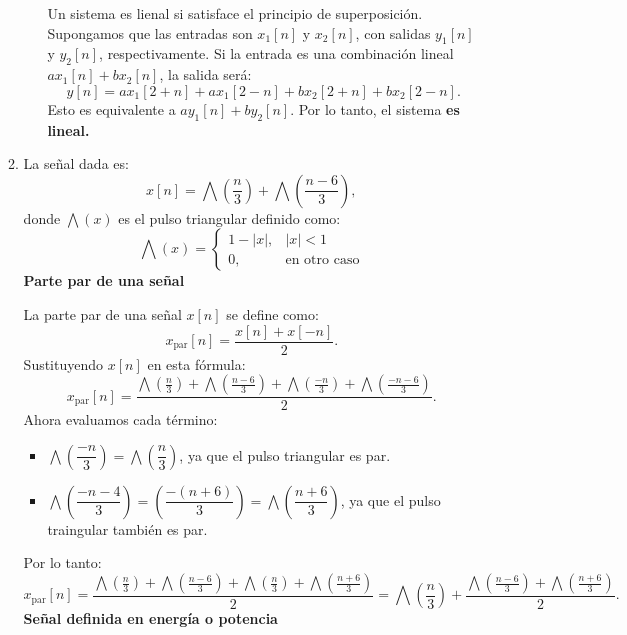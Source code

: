 \begin{enumerate}[label=\color{red}\textbf{\arabic*)}]
\begin{enumerate}[label=\color{red}\textbf{\alph*)}]
\begin{enumerate}[label=\textbf{\arabic*)}]
                    Un sistema es lienal si satisface el principio de superposición. Supongamos que las entradas son $x_1[n]$ y $x_2[n]$, con salidas $y_1[n]$ y $y_2[n]$, respectivamente. Si la entrada es una combinación lineal $ax_1[n]+bx_2[n]$, la salida será: \[
                        y[n]=ax_1[2+n]+ax_1[2-n]+bx_2[2+n]+bx_2[2-n].
                    \] 
                    Esto es equivalente a $ay_1[n]+by_2[n]$. Por lo tanto, el sistema \textbf{es lineal.} 
            \end{enumerate}
        \item {}

            La señal dada es: \[
                x[n]=\bigwedge\left( \dfrac{n}{3} \right) +\bigwedge\left( \dfrac{n-6}{3} \right) ,
            \] donde $\bigwedge(x)$ es el pulso triangular definido como:  \[
            \bigwedge(x)=\begin{cases}
                1-|x|, & |x|<1\\
                0, & \text{en otro caso}
            \end{cases}
            \] 
            \textbf{Parte par de una señal} 

            La parte par de una señal $x[n]$ se define como:  \[
                x_{\text{par}}[n]=\dfrac{x[n]+x[-n]}{2}.
            \] 
            Sustituyendo $x[n]$ en esta fórmula:  \[
                x_{\text{par}}[n]=\dfrac{\bigwedge\left( \frac{n}{3} \right) +\bigwedge\left( \frac{n-6}{3}  \right) +\bigwedge\left( \frac{-n}{3}  \right) +\bigwedge\left( \frac{-n-6}{3}  \right) }{2}.
            \] 
            Ahora evaluamos cada término: 
            \begin{itemize}[label=\textbullet]
                \item $\bigwedge\left( \dfrac{-n}{3} \right) =\bigwedge\left( \dfrac{n}{3} \right) $, ya que el pulso triangular es par.
                \item $\bigwedge\left( \dfrac{-n-4}{3} \right) =\left( \dfrac{-(n+6)}{3} \right) =\bigwedge\left( \dfrac{n+6}{3} \right) $, ya que el pulso traingular también es par.
            \end{itemize}
            Por lo tanto: \[
                x_{\text{par}}[n]=\dfrac{\bigwedge\left( \frac{n}{3}  \right) +\bigwedge\left( \frac{n-6}{3}  \right) +\bigwedge\left( \frac{n}{3}  \right) +\bigwedge\left( \frac{n+6}{3}  \right) }{2}=\bigwedge\left( \dfrac{n}{3} \right) +\dfrac{\bigwedge\left( \frac{n-6}{3}  \right) +\bigwedge\left( \frac{n+6}{3}  \right) }{2}.
            \] 
            \textbf{Señal definida en energía o potencia}


\end{enumerate}
\end{enumerate}
